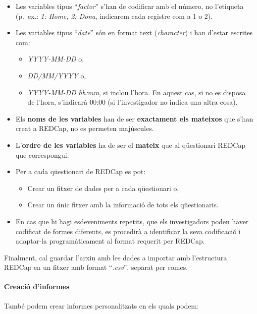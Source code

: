 \documentclass[
]{article}
\providecommand{\tightlist}{%
  \setlength{\itemsep}{0pt}\setlength{\parskip}{0pt}}
\begin{document}
\begin{itemize}
\tightlist
\item
  Les variables tipus ``\emph{factor}'' s'han de codificar amb el número, no l'etiqueta (p.~ex.: \emph{1: Home, 2: Dona}, indicarem cada registre com a 1 o 2).
\item
  Les variables tipus ``\emph{date}'' són en format text (\emph{character}) i han d'estar escrites com:

  \begin{itemize}
  \tightlist
  \item
    \emph{YYYY-MM-DD} o,
  \item
    \emph{DD/MM/YYYY} o,
  \item
    \emph{YYYY-MM-DD hh:mm}, si inclou l'hora. En aquest cas, si no es disposa de l'hora, s'indicarà 00:00 (si l'investigador no indica una altra cosa).
  \end{itemize}
\item
  Els \textbf{noms de les variables} han de ser \textbf{exactament els mateixos} que s'han creat a REDCap, no es permeten majúscules.
\item
  L'\textbf{ordre de les variables} ha de ser el \textbf{mateix} que al qüestionari REDCap que correspongui.
\item
  Per a cada qüestionari de REDCap es pot:

  \begin{itemize}
  \tightlist
  \item
    Crear un fitxer de dades per a cada qüestionari o,
  \item
    Crear un únic fitxer amb la informació de tots els qüestionaris.
  \end{itemize}
\item
  En cas que hi hagi esdeveniments repetits, que els investigadors poden haver codificat de formes diferents, es procedirà a identificar la seva codificació i adaptar-la programàticament al format requerit per REDCap.
\end{itemize}

Finalment, cal guardar l'arxiu amb les dades a importar amb l'estructura REDCap en un fitxer amb format ``\emph{.csv}'', separat per comes.

\hypertarget{en12}{%
\paragraph{Creació d'informes}\label{en12}}

També podem crear informes personalitzats en els quals podem:
\end{document}
